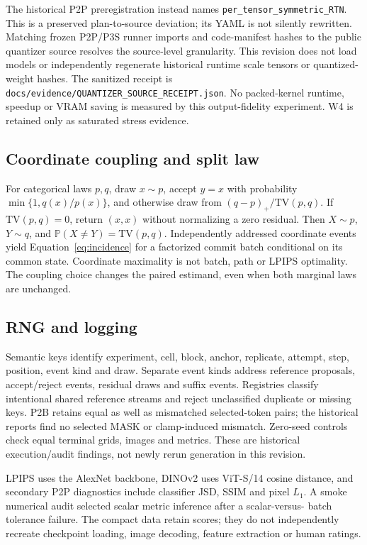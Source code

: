 \documentclass[11pt,a4paper]{article}
\theoremstyle{plain}
\theoremstyle{definition}
\theoremstyle{remark}
\newcommand{\TV}{\mathrm{TV}}
\newcommand{\Prob}{\mathbb{P}}
\begin{document}
The historical P2P preregistration instead names
\texttt{per\_tensor\_symmetric\_RTN}. This is a preserved plan-to-source
deviation; its YAML is not silently rewritten. Matching frozen P2P/P3S runner
imports and code-manifest hashes to the public quantizer source resolves the
source-level granularity. This revision does not load models or independently
regenerate historical runtime scale tensors or quantized-weight hashes. The
sanitized receipt is \nolinkurl{docs/evidence/QUANTIZER_SOURCE_RECEIPT.json}.
No packed-kernel runtime, speedup or VRAM saving is measured by this
output-fidelity experiment. W4 is retained only as saturated stress evidence.

\subsection{Coordinate coupling and split law}
For categorical laws $p,q$, draw $x\sim p$, accept $y=x$ with probability
$\min\{1,q(x)/p(x)\}$, and otherwise draw from $(q-p)_+/\TV(p,q)$.
If $\TV(p,q)=0$, return $(x,x)$ without normalizing a zero residual.
Then $X\sim p$, $Y\sim q$, and $\Prob(X\neq Y)=\TV(p,q)$.
Independently addressed coordinate events yield Equation~\eqref{eq:incidence}
for a factorized commit batch conditional on its common state. Coordinate
maximality is not batch, path or LPIPS optimality. The coupling choice changes
the paired estimand, even when both marginal laws are unchanged.

\subsection{RNG and logging}
Semantic keys identify experiment, cell, block, anchor, replicate, attempt,
step, position, event kind and draw. Separate event kinds address reference
proposals, accept/reject events, residual draws and suffix events. Registries
classify intentional shared reference streams and reject unclassified duplicate
or missing keys. P2B retains equal as well as mismatched selected-token pairs;
the historical reports find no selected MASK or clamp-induced mismatch.
Zero-seed controls check equal terminal grids, images and metrics. These are
historical execution/audit findings, not newly rerun generation in this revision.

LPIPS uses the AlexNet backbone, DINOv2 uses ViT-S/14 cosine distance, and
secondary P2P diagnostics include classifier JSD, SSIM and pixel $L_1$.
A smoke numerical audit selected scalar metric inference after a scalar-versus-
batch tolerance failure. The compact data retain scores; they do not independently
recreate checkpoint loading, image decoding, feature extraction or human ratings.
\end{document}
